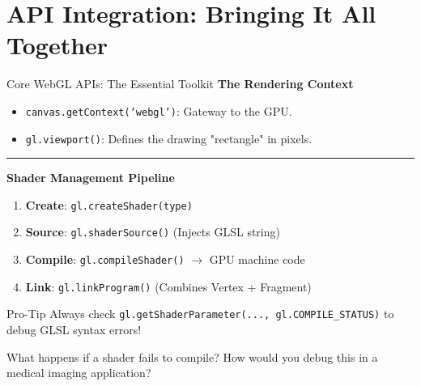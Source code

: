 \section{API Integration: Bringing It All Together}

\begin{frame}{Core WebGL APIs: The Essential Toolkit}
\textbf{The Rendering Context}
\begin{itemize}
  \item \texttt{canvas.getContext('webgl')}: Gateway to the GPU.
  \item \texttt{gl.viewport()}: Defines the drawing "rectangle" in pixels.
\end{itemize}

\hrule %
\vspace{0.5em}

\textbf{Shader Management Pipeline}
\begin{enumerate}
  \item \textbf{Create}: \texttt{gl.createShader(type)}
  \item \textbf{Source}: \texttt{gl.shaderSource()} (Injects GLSL string)
  \item \textbf{Compile}: \texttt{gl.compileShader()} $\to$ GPU machine code
  \item \textbf{Link}: \texttt{gl.linkProgram()} (Combines Vertex + Fragment)
\end{enumerate}

\begin{block}{Pro-Tip}
Always check \texttt{gl.getShaderParameter(..., gl.COMPILE\_STATUS)} to debug GLSL syntax errors!
\end{block}

What happens if a shader fails to compile? How would you debug this in a medical imaging application?
\end{frame}

